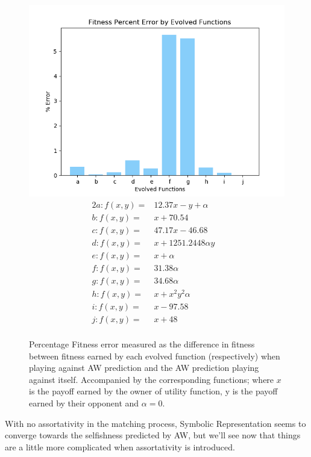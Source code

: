 \documentclass[11pt]{book}
\newcommand*{\np}{\par\noindent\newline}
\begin{document}
\begin{figure}
	\centering
	\includegraphics[scale=0.7]{resources/symmetric_percenterror_barchart_fitness_earned_against_target_r_00.png}
	\begin{alignat*}{2}
		a: f(x, y) = & 12.37x - y + \alpha &\\
		b: f(x, y) = & x + 70.54&\\
		c: f(x, y) = & 47.17x - 46.68&\\
		d: f(x, y) = & x + 1251.2448\alpha y&\\
		e: f(x, y) = & x + \alpha &\\
		f: f(x, y) = & 31.38\alpha &\\
		g: f(x, y) = & 34.68\alpha &\\
		h: f(x, y) = & x + x^2y^2\alpha &\\
		i: f(x, y) = & x - 97.58&\\
		j: f(x, y) = & x + 48&\\
	\end{alignat*}
	\caption{Percentage Fitness error measured as the difference in fitness between fitness earned by each evolved function (respectively) when playing against AW prediction and the AW prediction playing against itself. Accompanied by the corresponding functions; where $x$ is the payoff earned by the owner of utility function, y is the payoff earned by their opponent and $\alpha = 0$.}
	\label{barchart_fitness_earned_against_target_r_00}
\end{figure}

\np With no assortativity in the matching process, Symbolic Representation seems to converge towards the selfishness predicted by AW,
but we'll see now that things are a little more complicated when assortativity is introduced.
\end{document}
